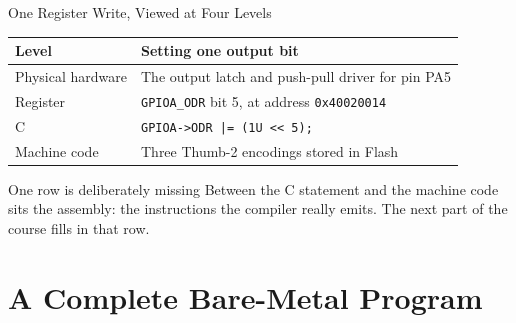 \documentclass[9pt,aspectratio=169,xcolor=table]{beamer}
\newcommand{\shl}{\texttt{<{}<}}
\begin{document}
\begin{frame}{One Register Write, Viewed at Four Levels}
    \begin{center}
    {\small
    \striped
    \begin{tabular}{@{}l R{.6\textwidth}@{}}
        \toprule
        \textbf{Level} & \textbf{Setting one output bit} \\
        \midrule
        Physical hardware & The output latch and push-pull driver for pin PA5 \\
        Register & \texttt{GPIOA\_ODR} bit 5, at address \texttt{0x40020014} \\
        C & \texttt{GPIOA->ODR |= (1U \shl\ 5);} \\
        Machine code & Three Thumb-2 encodings stored in Flash \\
        \bottomrule
    \end{tabular}}
    \end{center}

    \vspace{3mm}
    \begin{block}{One row is deliberately missing}
        Between the C statement and the machine code sits the \alert{assembly}: the instructions the compiler really emits. The next part of the course fills in that row.
    \end{block}
\end{frame}


\section{A Complete Bare-Metal Program}
\end{document}
